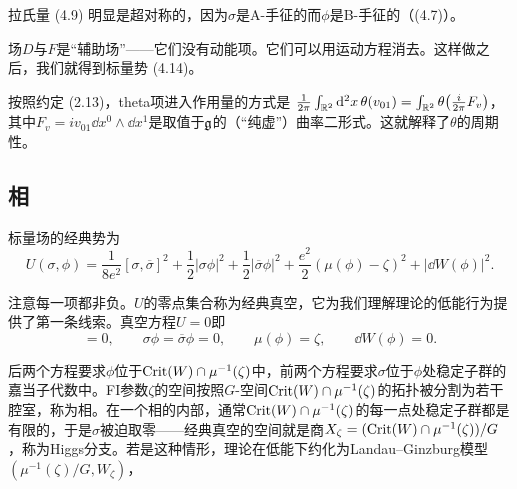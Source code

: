 拉氏量 (4.9) 明显是超对称的，因为$\sigma$是A-手征的而$\phi$是B-手征的（(4.7)）。

场$D$与$F$是“辅助场”——它们没有动能项。它们可以用运动方程消去。这样做之后，我们就得到标量势 (4.14)。

按照约定 (2.13)，theta项进入作用量的方式是
$\frac{1}{2\pi}\int_{\mathbb{R}^2}\mathrm{d}^2x\,\theta(v_{01})=\int_{\mathbb{R}^2}\theta\big(\frac{i}{2\pi}F_v\big)$，
其中$F_v=iv_{01}\dd x^0\wedge\dd x^1$是取值于$\mathfrak{g}$的（“纯虚”）曲率二形式。这就解释了$\theta$的周期性。

\subsection{相}

标量场的经典势为
\begin{equation}
U(\sigma,\phi)=\frac{1}{8e^2}[\sigma,\overline{\sigma}]^2+\frac{1}{2}|\sigma\phi|^2+\frac{1}{2}|\overline{\sigma}\phi|^2
+\frac{e^2}{2}(\mu(\phi)-\zeta)^2+|\dd W(\phi)|^2.
\tag{4.14}
\end{equation}

注意每一项都非负。$U$的零点集合称为经典真空，它为我们理解理论的低能行为提供了第一条线索。真空方程$U=0$即
\begin{equation}
[\sigma,\overline{\sigma}]=0,\qquad \sigma\phi=\overline{\sigma}\phi=0,\qquad \mu(\phi)=\zeta,\qquad \dd W(\phi)=0.
\tag{4.15}
\end{equation}

后两个方程要求$\phi$位于$\operatorname{Crit}(W)\cap\mu^{-1}(\zeta)$中，前两个方程要求$\sigma$位于$\phi$处稳定子群的嘉当子代数中。FI参数$\zeta$的空间按照$G$-空间$\operatorname{Crit}(W)\cap\mu^{-1}(\zeta)$的拓扑被分割为若干腔室，称为相。在一个相的内部，通常$\operatorname{Crit}(W)\cap\mu^{-1}(\zeta)$的每一点处稳定子群都是有限的，于是$\sigma$被迫取零——经典真空的空间就是商$X_\zeta=(\operatorname{Crit}(W)\cap\mu^{-1}(\zeta))/G$，称为Higgs分支。若是这种情形，理论在低能下约化为Landau–Ginzburg模型$(\mu^{-1}(\zeta)/G,W_\zeta)$，

